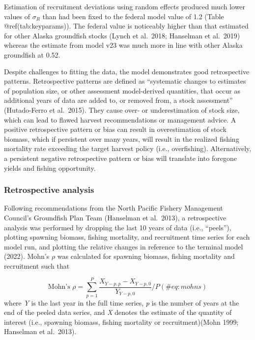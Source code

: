 \documentclass[
]{article}
\begin{document}
Estimation of recruitment deviations using random effects produced much
lower values of \(\sigma_R\) than had been fixed to the federal model
value of 1.2 (Table @ref(tab:keyparams)). The federal value is
noticeably higher than that estimated for other Alaska groundfish stocks
(Lynch et al.~2018; Hanselman et al.~2019) whereas the estimate from
model v23 was much more in line with other Alaska groundfish at 0.52.

Despite challenges to fitting the data, the model demonstrates good
retrospective patterns. Retrospective patterns are defined as
``systematic changes to estimates of population size, or other
assessment model-derived quantities, that occur as additional years of
data are added to, or removed from, a stock assessment'' (Hutado-Ferro
et al.~2015). They cause over- or underestimation of stock size, which
can lead to flawed harvest recommendations or management advice. A
positive retrospective pattern or bias can result in overestimation of
stock biomass, which if persistent over many years, will result in the
realized fishing mortality rate exceeding the target harvest policy
(i.e., overfishing). Alternatively, a persistent negative retrospective
pattern or bias will translate into foregone yields and fishing
opportunity.

\hypertarget{retrospective-analysis}{%
\subsubsection{Retrospective analysis}\label{retrospective-analysis}}

Following recommendations from the North Pacific Fishery Management
Council's Groundfish Plan Team (Hanselman et al.~2013), a retrospective
analysis was performed by dropping the last 10 years of data (i.e.,
``peels''), plotting spawning biomass, fishing mortality, and
recruitment time series for each model run, and plotting the relative
changes in reference to the terminal model (2022). Mohn's \(\rho\) was
calculated for spawning biomass, fishing mortality and recruitment such
that

\[
\begin{equation}
\text{Mohn's } \rho=\sum_{p=1}^{P}\frac{X_{Y-p,p}-X_{Y-p,0}}{Y_{Y-p,0}}/P
(\#eq:mohns)
\end{equation} 
\] where \emph{Y} is the last year in the full time series, \emph{p} is
the number of years at the end of the peeled data series, and \emph{X}
denotes the estimate of the quantity of interest (i.e., spawning
biomass, fishing mortality or recruitment)(Mohn 1999; Hanselman et
al.~2013).
\end{document}
